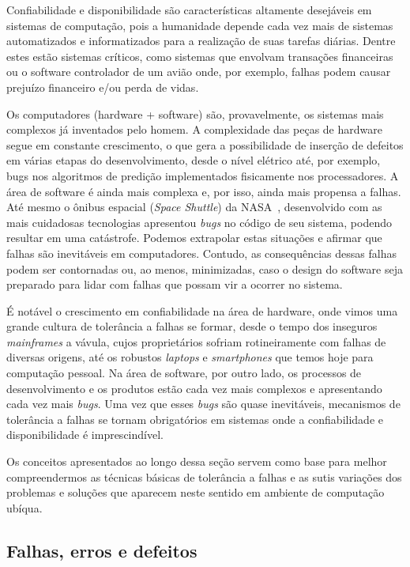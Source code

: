 Confiabilidade e disponibilidade são características altamente desejáveis em sistemas de computação, pois a humanidade depende cada vez mais de sistemas automatizados e informatizados para a realização de suas tarefas diárias. Dentre estes estão sistemas críticos, como sistemas que envolvam transações financeiras ou o software controlador de um avião onde, por exemplo, falhas podem causar prejuízo financeiro e/ou perda de vidas.

Os computadores (hardware + software) são, provavelmente, os sistemas mais complexos já inventados pelo homem. A complexidade das peças de hardware segue em constante crescimento, o que gera a possibilidade de inserção de defeitos em várias etapas do desenvolvimento, desde o nível elétrico até, por exemplo, bugs nos algoritmos de predição implementados fisicamente nos processadores. A área de software é ainda mais complexa e, por isso, ainda mais propensa a falhas. Até mesmo o ônibus espacial (\emph{Space Shuttle}) da NASA~\cite{BonacheaOnline}, desenvolvido com as mais cuidadosas tecnologias apresentou \emph{bugs} no código de seu sistema, podendo resultar em uma catástrofe. Podemos extrapolar estas situações e afirmar que falhas são inevitáveis em computadores. Contudo, as consequências dessas falhas podem ser contornadas ou, ao menos, minimizadas, caso o design do software seja preparado para lidar com falhas que possam vir a ocorrer no sistema.

É notável o crescimento em confiabilidade na área de hardware, onde vimos uma grande cultura de tolerância a falhas se formar, desde o tempo dos inseguros \emph{mainframes} a vávula, cujos proprietários sofriam rotineiramente com falhas de diversas origens, até os robustos \emph{laptops} e \emph{smartphones} que temos hoje para computação pessoal. Na área de software, por outro lado, os processos de desenvolvimento e os produtos estão cada vez mais complexos e apresentando cada vez mais \emph{bugs}. Uma vez que esses \emph{bugs} são quase inevitáveis, mecanismos de tolerância a falhas se tornam obrigatórios em sistemas onde a confiabilidade e disponibilidade é imprescindível.

Os conceitos apresentados ao longo dessa seção servem como base para melhor compreendermos as técnicas básicas de tolerância a falhas e as sutis variações dos problemas e soluções que aparecem neste sentido em ambiente de computação ubíqua.

\subsection{Falhas, erros e defeitos} %
\label{sub:falhas_erros_e_defeitos}

